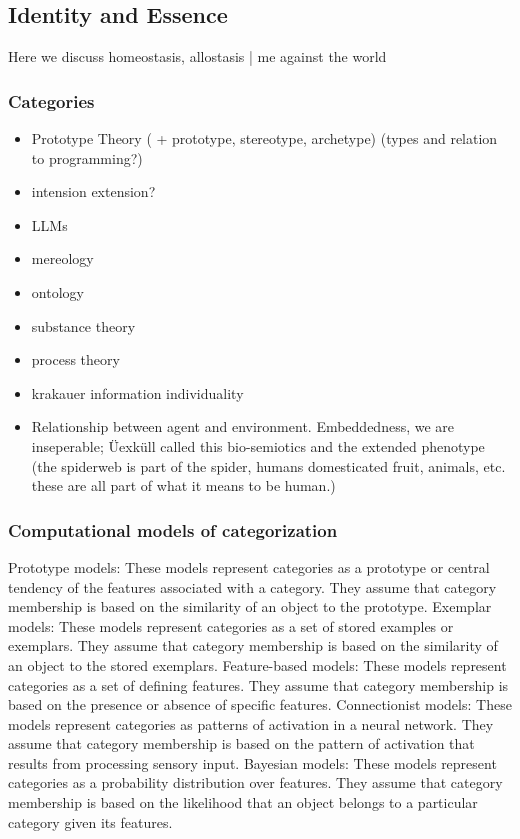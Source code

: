 \subsection{Identity and Essence}
Here we discuss homeostasis, allostasis | me against the world
\subsubsection{Categories}
\begin{itemize}
    \item Prototype Theory ( + prototype, stereotype, archetype) (types and relation to programming?)
    \item intension extension?
    \item LLMs
    \item mereology
    \item ontology
\end{itemize}

\begin{itemize}
    \item substance theory
    \item process theory
    \item krakauer information individuality
    \item Relationship between agent and environment. Embeddedness, we are inseperable; Üexküll called this bio-semiotics and the extended phenotype (the spiderweb is part of the spider, humans domesticated fruit, animals, etc. these are all part of what it means to be human.)
\end{itemize}

\subsubsection{Computational models of categorization}
Prototype models: These models represent categories as a prototype or central tendency of the features associated with a category. They assume that category membership is based on the similarity of an object to the prototype.
Exemplar models: These models represent categories as a set of stored examples or exemplars. They assume that category membership is based on the similarity of an object to the stored exemplars.
Feature-based models: These models represent categories as a set of defining features. They assume that category membership is based on the presence or absence of specific features.
Connectionist models: These models represent categories as patterns of activation in a neural network. They assume that category membership is based on the pattern of activation that results from processing sensory input.
Bayesian models: These models represent categories as a probability distribution over features. They assume that category membership is based on the likelihood that an object belongs to a particular category given its features.

